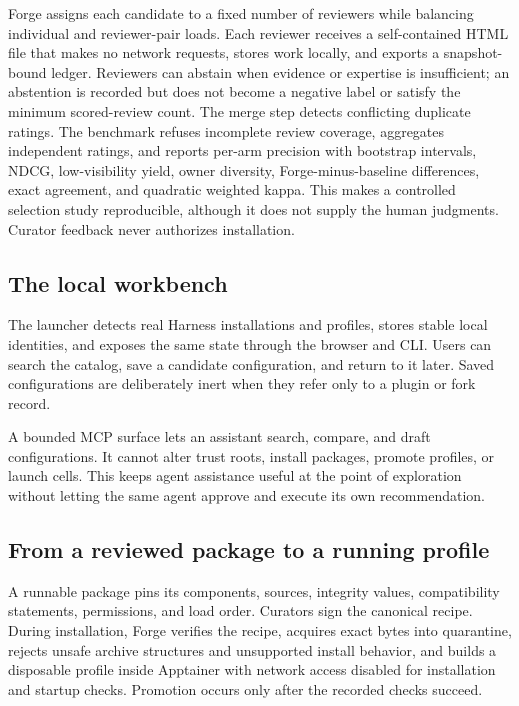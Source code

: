 \documentclass[10pt,twocolumn]{article}
\begin{document}
Forge assigns each candidate to a fixed number of reviewers while balancing individual and reviewer-pair loads. Each reviewer receives a self-contained HTML file that makes no network requests, stores work locally, and exports a snapshot-bound ledger. Reviewers can abstain when evidence or expertise is insufficient; an abstention is recorded but does not become a negative label or satisfy the minimum scored-review count. The merge step detects conflicting duplicate ratings. The benchmark refuses incomplete review coverage, aggregates independent ratings, and reports per-arm precision with bootstrap intervals, NDCG, low-visibility yield, owner diversity, Forge-minus-baseline differences, exact agreement, and quadratic weighted kappa. This makes a controlled selection study reproducible, although it does not supply the human judgments. Curator feedback never authorizes installation.

\subsection{The local workbench}

The launcher detects real Harness installations and profiles, stores stable local identities, and exposes the same state through the browser and CLI. Users can search the catalog, save a candidate configuration, and return to it later. Saved configurations are deliberately inert when they refer only to a plugin or fork record.\cite{readme,configs}

A bounded MCP surface lets an assistant search, compare, and draft configurations. It cannot alter trust roots, install packages, promote profiles, or launch cells. This keeps agent assistance useful at the point of exploration without letting the same agent approve and execute its own recommendation.

\subsection{From a reviewed package to a running profile}

A runnable package pins its components, sources, integrity values, compatibility statements, permissions, and load order. Curators sign the canonical recipe. During installation, Forge verifies the recipe, acquires exact bytes into quarantine, rejects unsafe archive structures and unsupported install behavior, and builds a disposable profile inside Apptainer with network access disabled for installation and startup checks. Promotion occurs only after the recorded checks succeed.\cite{signedpackages,installation,sandbox}
\end{document}
